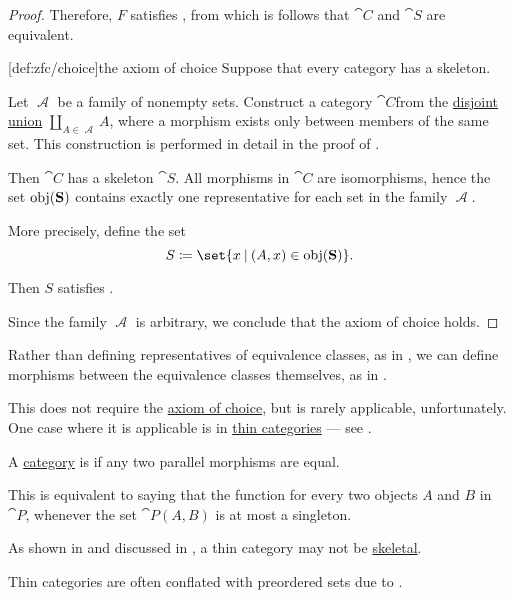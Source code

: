 \begin{proof}
  Therefore, \( F \) satisfies , from which is follows that \( \cat{C} \) and \( \cat{S} \) are equivalent.

  [def:zfc/choice]{the axiom of choice} Suppose that every category has a skeleton.

  Let \( \mscrA \) be a family of nonempty sets. Construct a category \( \cat{C} \)from the \hyperref[def:disjoint_union]{disjoint union} \( \coprod_{A \in \mscrA} A \), where a morphism exists only between members of the same set. This construction is performed in detail in the proof of .

  Then \( \cat{C} \) has a skeleton \( \cat{S} \). All morphisms in \( \cat{C} \) are isomorphisms, hence the set \( \operatorname{obj}(\operatorname{\mathbf{S}}) \) contains exactly one representative for each set in the family \( \mscrA \).

  More precisely, define the set
  \begin{equation*}
    S \coloneqq \set{ x \given (A, x) \in \obj(\cat{S}) }.
  \end{equation*}

  Then \( S \) satisfies .

  Since the family \( \mscrA \) is arbitrary, we conclude that the axiom of choice holds.
\end{proof}

\begin{remark}\label{rem:skeletons_and_thin_categories}
  Rather than defining representatives of equivalence classes, as in , we can define morphisms between the equivalence classes themselves, as in .

  This does not require the \hyperref[def:zfc/choice]{axiom of choice}, but is rarely applicable, unfortunately. One case where it is applicable is in \hyperref[def:thin_category]{thin categories} --- see .
\end{remark}

\begin{definition}\label{def:thin_category}
  A \hyperref[def:category]{category} is  if any two parallel morphisms are equal.

  This is equivalent to saying that the function for every two objects \( A \) and \( B \) in \( \cat{P} \), whenever the set \( \cat{P}(A, B) \) is at most a singleton.

  As shown in  and discussed in , a thin category may not be \hyperref[def:skeletal_category]{skeletal}.

  Thin categories are often conflated with preordered sets due to .
\end{definition}

